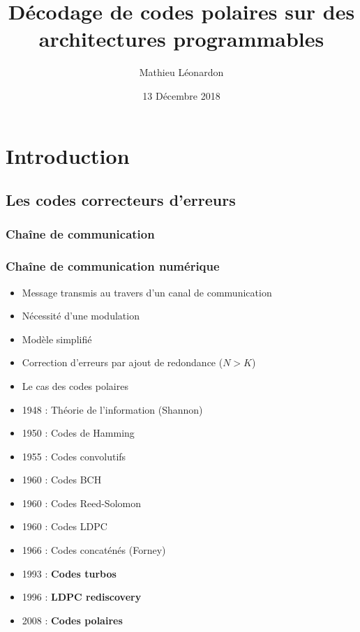 \documentclass[t,compress,mathserif,12pt,xcolor=dvipsnames]{beamer}
\title{\textbf{Décodage de codes polaires sur des architectures programmables}}
\author[Mathieu Léonardon\hspace{7.51cm}{mathieu.leonardon@ims-bordeaux.fr}]    {Mathieu Léonardon}
\date{13 Décembre 2018}
\begin{document}
\begin{frame}[c]
\titlepage
\end{frame}

\begin{frame}[c]
	\tableofcontents[
	subsectionstyle=hide,
	]
\end{frame}




\section[Introduction]{Introduction}
\subsection*{Les codes correcteurs d'erreurs}

\begin{frame}[c]
	\begin{center}
	\end{center}
  	\frametitle<1>{Chaîne de communication}
  	\frametitle<2->{Chaîne de communication numérique}
	\begin{itemize}
		\item<1-> Message transmis au travers d'un canal de communication
		\item<2-> Nécessité d'une modulation
		\item<3-> Modèle simplifié
		\item<4-> Correction d'erreurs par ajout de redondance ($N>K$)
		\item<5-> Le cas des codes polaires
	\end{itemize}
\end{frame}

\begin{frame}
\vfill
	\begin{itemize}
		\item 1948 : Théorie de l’information (Shannon)
		\item 1950 : Codes de Hamming
		\item 1955 : Codes convolutifs
		\item 1960 : Codes BCH
		\item 1960 : Codes Reed-Solomon
		\item 1960 : Codes LDPC 
		\item 1966 : Codes concaténés (Forney)
		\item 1993 : \textbf{Codes turbos}
		\item 1996 : \textbf{LDPC rediscovery}
		\item 2008 : \textbf{Codes polaires}
	\end{itemize}
	\vfill
\end{frame}
\end{document}
